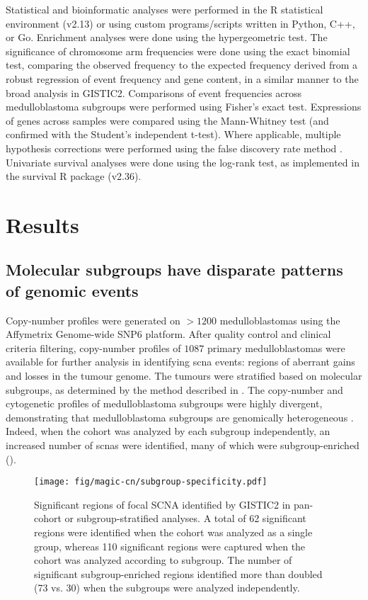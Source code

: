 Statistical and bioinformatic analyses were performed in the R statistical environment (v2.13) or using custom programs/scripts written in Python, C++, or Go. Enrichment analyses were done using the hypergeometric test. The significance of chromosome arm frequencies were done using the exact binomial test, comparing the observed frequency to the expected frequency derived from a robust regression of event frequency and gene content, in a similar manner to the broad analysis in GISTIC2. Comparisons of event frequencies across medulloblastoma subgroups were performed using Fisher’s exact test. Expressions of genes across samples were compared using the Mann-Whitney test (and confirmed with the Student’s independent t-test). Where applicable, multiple hypothesis corrections were performed using the false discovery rate method . Univariate survival analyses were done using the log-rank test, as implemented in the survival R package (v2.36).

\clearpage

\section{Results}

\subsection{Molecular subgroups have disparate patterns of genomic events}

Copy-number profiles were generated on $> 1200$ medulloblastomas using the Affymetrix Genome-wide SNP6 platform. After quality control and clinical criteria filtering, copy-number profiles of $1087$ primary medulloblastomas were available for further analysis in identifying \gls{scna} events: regions of aberrant gains and losses in the tumour genome. The tumours were stratified based on molecular subgroups, as determined by the method described in . The copy-number and cytogenetic profiles of medulloblastoma subgroups were highly divergent, demonstrating that medulloblastoma subgroups are genomically heterogeneous . Indeed, when the cohort was analyzed by each subgroup independently, an increased number of \gls{scnas} were identified, many of which were subgroup-enriched ().

\begin{SCfigure}[5]
	\centering
	\texttt{[image: fig/magic-cn/subgroup-specificity.pdf]}
	\caption[Significant regions of focal SCNA identified by GISTIC2]
	{
	Significant regions of focal SCNA identified by GISTIC2 in pan-cohort or subgroup-stratified analyses.
	A total of 62 significant regions were identified when the cohort was analyzed as a single group, whereas 110 significant regions were captured when the cohort was analyzed according to subgroup. The number of significant subgroup-enriched regions identified more than doubled (73 vs. 30) when the subgroups were analyzed independently.
	}
	\label{fig:subgroup-specificity}
\end{SCfigure}

